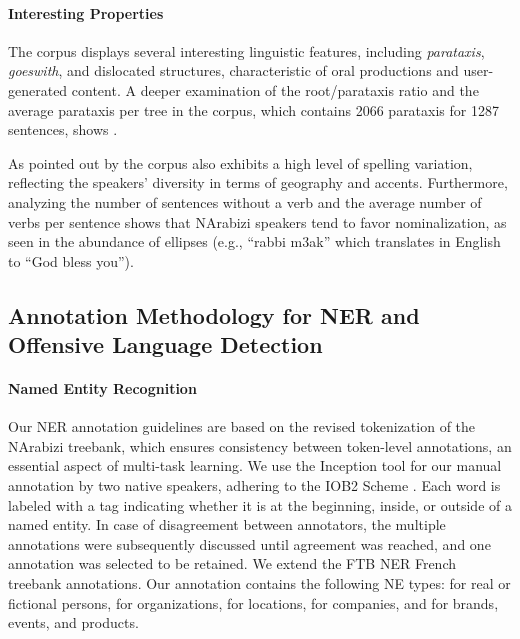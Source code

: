 \documentclass[11pt]{article}
\newcommand{\org}{{\sc {\tt ORG}}\xspace}
\newcommand{\loc}{{\sc {\tt LOC}}\xspace}
\newcommand{\comp}{{\sc {\tt COMP}}\xspace}
\newcommand{\per}{{\sc {\tt PER}}\xspace}
\newcommand{\oth}{{\sc {\tt OTH}}\xspace}
\begin{document}

\paragraph{Interesting Properties} The corpus displays several interesting linguistic features, including \textit{parataxis}, \textit{goeswith}, and dislocated structures, characteristic of oral productions and user-generated content. A deeper examination of the root/parataxis ratio and the average parataxis per tree in the corpus, which contains 2066 parataxis for 1287 sentences, shows .

As pointed out by \citet{seddah-etal-2020-building} the corpus also exhibits a high level of spelling variation, reflecting the speakers' diversity in terms of geography and accents. Furthermore, analyzing the number of sentences without a verb and the average number of verbs per sentence shows that NArabizi speakers tend to favor nominalization, as seen in the abundance of ellipses (e.g., ``rabbi m3ak'' which translates in English to ``God bless you'').

\subsection{Annotation Methodology for NER and Offensive Language Detection}
\paragraph{Named Entity Recognition}
Our NER annotation guidelines are based on the revised tokenization of the NArabizi treebank, which ensures consistency between token-level annotations, an essential aspect of multi-task learning. We use the Inception tool \cite{klie2018inception} for our manual annotation by two native speakers, adhering to the IOB2 Scheme \cite{tjong-kim-sang-veenstra-1999-representing}. Each word is labeled with a tag indicating whether it is at the beginning, inside, or outside of a named entity. In case of disagreement between annotators, the multiple annotations were subsequently discussed until agreement was reached, and one annotation was selected to be retained.  
We extend the FTB NER \cite{sagot2012annotation} French treebank annotations. Our annotation contains the following NE types: \per for real or fictional persons, \org for organizations, \loc for locations, \comp for companies, and \oth for brands, events, and products. 
\end{document}
